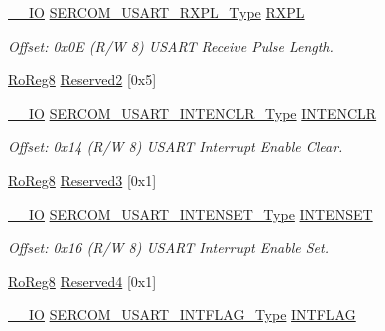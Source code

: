 \begin{DoxyCompactItemize}
\mbox{\hyperlink{core__cm0plus_8h_aec43007d9998a0a0e01faede4133d6be}{\+\_\+\+\_\+\+IO}} \mbox{\hyperlink{union_s_e_r_c_o_m___u_s_a_r_t___r_x_p_l___type}{S\+E\+R\+C\+O\+M\+\_\+\+U\+S\+A\+R\+T\+\_\+\+R\+X\+P\+L\+\_\+\+Type}} \mbox{\hyperlink{struct_sercom_usart_a0fec254c3c796a331d3ee653dc9e48a3}{R\+X\+PL}}
\begin{DoxyCompactList}\small\item\em Offset\+: 0x0E (R/W 8) U\+S\+A\+RT Receive Pulse Length. \end{DoxyCompactList}\item 
\mbox{\hyperlink{group___s_a_m_d21_e15_a__definitions_ga0d957f1433aaf5d70e4dc2b68288442d}{Ro\+Reg8}} \mbox{\hyperlink{struct_sercom_usart_adeca0ecf89b264312a507e2e88b9eb1a}{Reserved2}} \mbox{[}0x5\mbox{]}
\item 
\mbox{\hyperlink{core__cm0plus_8h_aec43007d9998a0a0e01faede4133d6be}{\+\_\+\+\_\+\+IO}} \mbox{\hyperlink{union_s_e_r_c_o_m___u_s_a_r_t___i_n_t_e_n_c_l_r___type}{S\+E\+R\+C\+O\+M\+\_\+\+U\+S\+A\+R\+T\+\_\+\+I\+N\+T\+E\+N\+C\+L\+R\+\_\+\+Type}} \mbox{\hyperlink{struct_sercom_usart_a848eefa4260bacb6ddba4f66bed40c6a}{I\+N\+T\+E\+N\+C\+LR}}
\begin{DoxyCompactList}\small\item\em Offset\+: 0x14 (R/W 8) U\+S\+A\+RT Interrupt Enable Clear. \end{DoxyCompactList}\item 
\mbox{\hyperlink{group___s_a_m_d21_e15_a__definitions_ga0d957f1433aaf5d70e4dc2b68288442d}{Ro\+Reg8}} \mbox{\hyperlink{struct_sercom_usart_ae12c3e940f27988a085afebe2f779a21}{Reserved3}} \mbox{[}0x1\mbox{]}
\item 
\mbox{\hyperlink{core__cm0plus_8h_aec43007d9998a0a0e01faede4133d6be}{\+\_\+\+\_\+\+IO}} \mbox{\hyperlink{union_s_e_r_c_o_m___u_s_a_r_t___i_n_t_e_n_s_e_t___type}{S\+E\+R\+C\+O\+M\+\_\+\+U\+S\+A\+R\+T\+\_\+\+I\+N\+T\+E\+N\+S\+E\+T\+\_\+\+Type}} \mbox{\hyperlink{struct_sercom_usart_aceb9c7f6f8de52cbb4da72038488c26c}{I\+N\+T\+E\+N\+S\+ET}}
\begin{DoxyCompactList}\small\item\em Offset\+: 0x16 (R/W 8) U\+S\+A\+RT Interrupt Enable Set. \end{DoxyCompactList}\item 
\mbox{\hyperlink{group___s_a_m_d21_e15_a__definitions_ga0d957f1433aaf5d70e4dc2b68288442d}{Ro\+Reg8}} \mbox{\hyperlink{struct_sercom_usart_a5ca570382e961b7801aeafc161de2571}{Reserved4}} \mbox{[}0x1\mbox{]}
\item 
\mbox{\hyperlink{core__cm0plus_8h_aec43007d9998a0a0e01faede4133d6be}{\+\_\+\+\_\+\+IO}} \mbox{\hyperlink{union_s_e_r_c_o_m___u_s_a_r_t___i_n_t_f_l_a_g___type}{S\+E\+R\+C\+O\+M\+\_\+\+U\+S\+A\+R\+T\+\_\+\+I\+N\+T\+F\+L\+A\+G\+\_\+\+Type}} \mbox{\hyperlink{struct_sercom_usart_a66228492849f2a35ebb5390c3f7e4c3e}{I\+N\+T\+F\+L\+AG}}

\end{DoxyCompactItemize}
